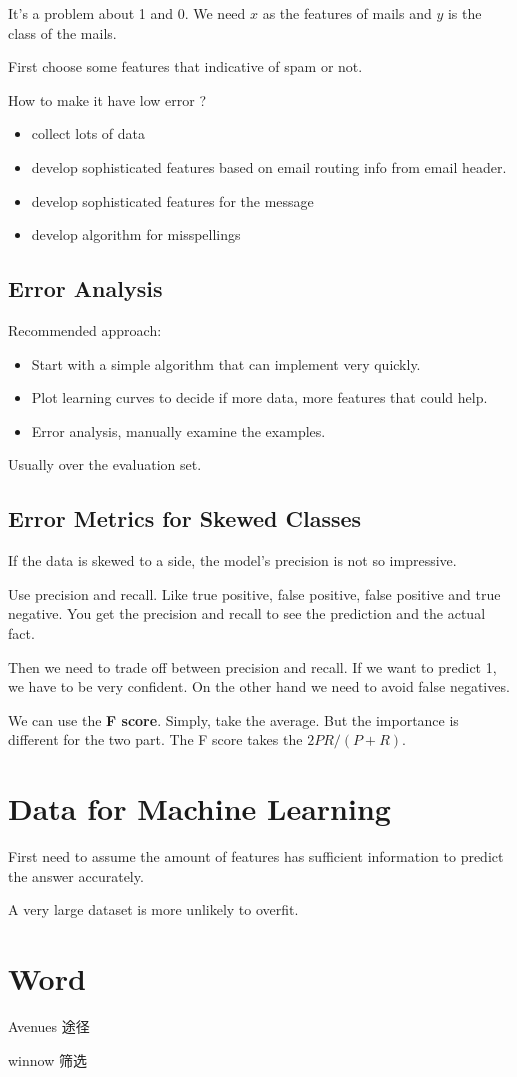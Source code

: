 \documentclass[en,11pt,english,black,simple]{../elegantbook}
\begin{document}
It's a problem about 1 and 0. We need \(x \) as the features of mails and \(y\) is the class of the mails. 

First choose some features that indicative of spam or not.

How to make it have low error ? 

\begin{itemize}
    \item collect lots of data 
    \item develop sophisticated features based on email routing info from email header.
    \item develop sophisticated features for the message 
    \item develop algorithm for misspellings 
\end{itemize}

\subsection{Error Analysis}

Recommended approach:

\begin{itemize}
    \item Start with a simple algorithm that can implement very quickly. 
    \item Plot learning curves to decide if more data, more features that could help.
    \item Error analysis, manually examine the examples. 
\end{itemize}

Usually over the evaluation set. 

\subsection{Error Metrics for Skewed Classes}

If the data is skewed to a side, the model's precision is not so impressive.

Use precision and recall. Like true positive, false positive, false positive and true negative. You get the precision and recall to see the prediction and the actual fact.

Then we need to trade off between precision and recall. If we want to predict 1, we have to be very confident. On the other hand we need to avoid false negatives.

We can use the \textbf{F score}. Simply, take the average. But the importance is different for the two part. The F score takes the \(2 P R / (P + R)\).

\section{Data for Machine Learning}

First need to assume the amount of features has sufficient information to predict the answer accurately.

A very large dataset is more unlikely to overfit.



\section*{Word}


Avenues 途径

winnow 筛选

\let\chapname\undefined
\ifx\mainclass\undefined
\end{document}
